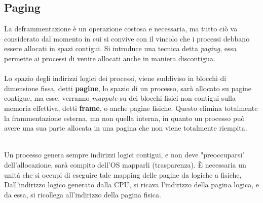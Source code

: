 \documentclass[12pt, letterpaper]{article}
\newcommand{\acc}{\\\hphantom{}\\}
\begin{document}
\subsection{Paging}
La deframmentazione è un operazione costosa e necessaria, ma tutto ciò va considerato dal momento in cui si convive 
con il vincolo che i processi debbano essere allocati in spazi contigui. Si introduce una tecnica detta \textit{paging}, essa 
permette ai processi di venire allocati anche in maniera discontigua.\acc 
Lo spazio degli indirizzi logici dei processi, viene suddiviso in blocchi di dimensione fissa, detti 
\textbf{pagine}, lo spazio di un processo, sarà allocato su pagine contigue, ma esse, verranno 
\textit{mappate} su dei blocchi fisici non-contigui sulla memoria effettiva, detti \textbf{frame}, o anche 
pagine fisiche. Questo elimina totalmente la frammentazione esterna, ma non quella interna, in quanto un processo può 
avere una sua parte allocata in una pagina che non viene totalmente riempita.
\begin{figure}[h]
\end{figure}\\
Un processo genera sempre indirizzi logici contigui, e non deve "preoccuparsi"
 dell’allocazione, sarà compito dell’OS mapparli (trasparenza).
È necessaria un unità che si occupi di eseguire tale mapping delle pagine da logiche a fisiche, Dall’indirizzo logico generato dalla CPU, si ricava l’indirizzo della pagina logica,
e da essa, si ricollega all'indirizzo della pagina fisica.
\begin{figure}[h]
\end{figure}\\
\end{document}
